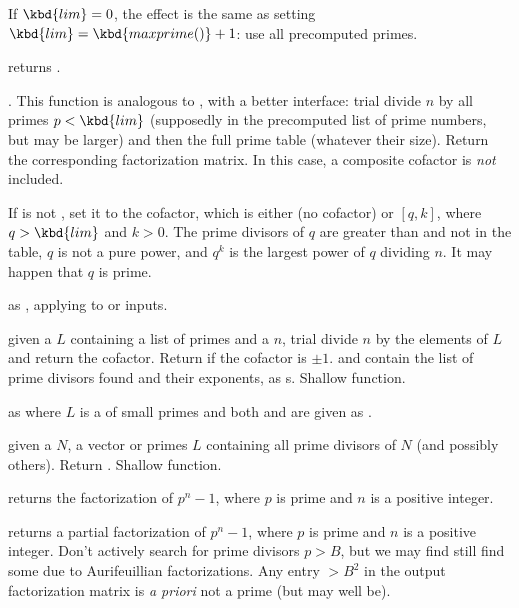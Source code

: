 If $\kbd{lim} = 0$, the effect is the same as setting $\kbd{lim} =
\kbd{maxprime()} + 1$: use all precomputed primes.

 returns
.

. This function
is analogous to
, with a better interface: trial divide $n$ by all
primes $p < \kbd{lim}$ (supposedly in the precomputed list of prime numbers,
but  may be larger) and then the full  prime table
(whatever their size).
Return the corresponding factorization matrix. In this case, a composite
cofactor is \emph{not} included.

If  is not , set it to the cofactor, which is either
 (no cofactor) or $[q,k]$, where $q > \kbd{lim}$ and $k > 0$.
The prime divisors of $q$ are greater than  and not in the
 table, $q$ is not a pure power, and $q^k$ is the largest
power of $q$ dividing $n$. It may happen that $q$ is prime.

 as , applying to
 or  inputs.

 given a 
$L$ containing a list of primes and a  $n$, trial divide
$n$ by the elements of $L$ and return the cofactor. Return  if the
cofactor is $\pm 1$.  and  contain the list of prime divisors
found and their exponents, as s. Shallow function.

 as
 where $L$ is a  of small primes and both
 and  are given as .

 given a  $N$, a vector or
primes $L$ containing all prime divisors of $N$ (and possibly others). Return
. Shallow function.

 returns the factorization of $p^n-1$,
where $p$ is prime and $n$ is a positive integer.

 returns a partial
factorization of $p^n-1$, where $p$ is prime and $n$ is a positive integer.
Don't actively search for prime divisors $p > B$, but we may find still find
some due to Aurifeuillian factorizations. Any entry $> B^2$ in the output
factorization matrix is \emph{a priori} not a prime (but may well be).

